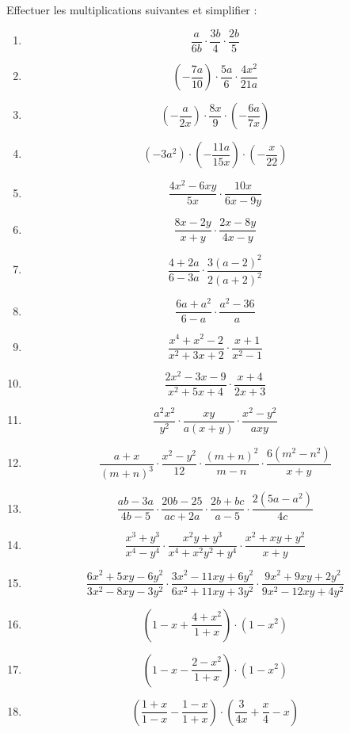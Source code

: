 \begin{exercice}
Effectuer les multiplications suivantes et simplifier : 
\begin{multicols}{2}
\begin{enumerate}
\item $$\frac{a}{6b}\cdot \frac{3b}{4}\cdot \frac{2b}{5}$$
\item $$\left( -\frac{7a}{10} \right)\cdot \frac{5a}{6}\cdot \frac{4{{x}^{2}}}{21a}$$
\item $$\left( -\frac{a}{2x} \right)\cdot \frac{8x}{9}\cdot \left( -\frac{6a}{7x} \right)$$
\item $$\left( -3{{a}^{2}} \right)\cdot \left( -\frac{11a}{15x} \right)\cdot \left( -\frac{x}{22} \right)$$
\item $$\frac{4{{x}^{2}}-6xy}{5x}\cdot \frac{10x}{6x-9y}$$
\item $$\frac{8x-2y}{x+y}\cdot \frac{2x-8y}{4x-y}$$
\item $$\frac{4+2a}{6-3a}\cdot \frac{3{{(a-2)}^{2}}}{2{{(a+2)}^{2}}}$$
\item $$\frac{6a+{{a}^{2}}}{6-a}\cdot \frac{{{a}^{2}}-36}{a}$$
\item $$\frac{{{x}^{4}}+{{x}^{2}}-2}{{{x}^{2}}+3x+2}\cdot \frac{x+1}{{{x}^{2}}-1}$$
\item $$\frac{2{{x}^{2}}-3x-9}{{{x}^{2}}+5x+4}\cdot \frac{x+4}{2x+3}$$
\item $$\frac{{{a}^{2}}{{x}^{2}}}{{{y}^{2}}}\cdot \frac{xy}{a(x+y)}\cdot \frac{{{x}^{2}}-{{y}^{2}}}{axy}$$
\item $$\frac{a+x}{{{(m+n)}^{3}}}\cdot \frac{{{x}^{2}}-{{y}^{2}}}{12}\cdot \frac{{{(m+n)}^{2}}}{m-n}\cdot \frac{6({{m}^{2}}-{{n}^{2}})}{x+y}$$
\item $$\frac{ab-3a}{4b-5}\cdot \frac{20b-25}{ac+2a}\cdot \frac{2b+bc}{a-5}\cdot \frac{2(5a-{{a}^{2}})}{4c}$$
\item $$\frac{{{x}^{3}}+{{y}^{3}}}{{{x}^{4}}-{{y}^{4}}}\cdot \frac{{{x}^{2}}y+{{y}^{3}}}{{{x}^{4}}+{{x}^{2}}{{y}^{2}}+{{y}^{4}}}\cdot \frac{{{x}^{2}}+xy+{{y}^{2}}}{x+y}$$
\item $$\frac{6{{x}^{2}}+5xy-6{{y}^{2}}}{3{{x}^{2}}-8xy-3{{y}^{2}}}\cdot \frac{3{{x}^{2}}-11xy+6{{y}^{2}}}{6{{x}^{2}}+11xy+3{{y}^{2}}}\cdot \frac{9{{x}^{2}}+9xy+2{{y}^{2}}}{9{{x}^{2}}-12xy+4{{y}^{2}}}$$
\item $$\left( 1-x+\frac{4+{{x}^{2}}}{1+x} \right)\cdot (1-{{x}^{2}})$$
\item $$\left( 1-x-\frac{2-{{x}^{2}}}{1+x} \right)\cdot (1-{{x}^{2}})$$
\item $$\left( \frac{1+x}{1-x}-\frac{1-x}{1+x} \right)\cdot \left( \frac{3}{4x}+\frac{x}{4}-x \right)$$

\end{enumerate}
\end{multicols}
\end{exercice}
